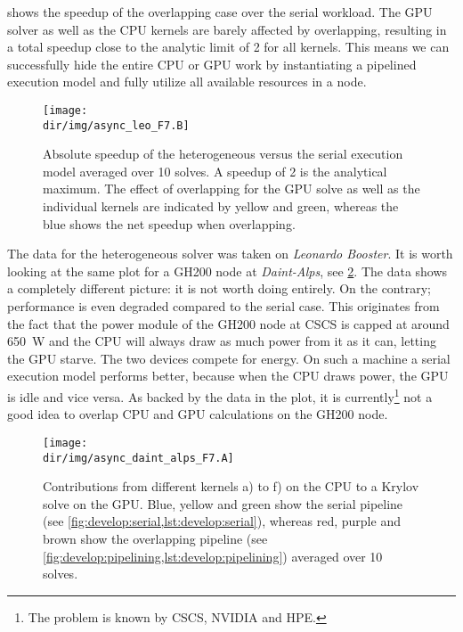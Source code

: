  shows the speedup of the overlapping case over the serial workload.
The GPU solver as well as the CPU kernels are barely affected by overlapping, resulting in a total speedup close to the analytic limit of \num{2} for all kernels.
This means we can successfully hide the entire CPU or GPU work by instantiating a pipelined execution model and fully utilize all available resources in a node.
\begin{figure}
\centering
\texttt{[image: \\dir/img/async\_leo\_F7.B]}
\caption{
Absolute speedup of the heterogeneous versus the serial execution model averaged over \num{10} solves.
A speedup of \num{2} is the analytical maximum.
The effect of overlapping for the GPU solve as well as the individual kernels are indicated by yellow and green, whereas the blue shows the net speedup when overlapping.
}
\label{fig:async:F7:leo:speedup}
\end{figure}

The data for the heterogeneous solver was taken on \emph{Leonardo Booster}.
It is worth looking at the same plot for a GH200 node at \emph{Daint-Alps}, see \cref{fig:async:F7:daint:bar}.
The data shows a completely different picture: it is not worth doing entirely.
On the contrary; performance is even degraded compared to the serial case.
This originates from the fact that the power module of the GH200 node at CSCS is capped at around \SI{650}{\watt} and the CPU will always draw as much power from it as it can, letting the GPU starve.
The two devices compete for energy.
On such a machine a serial execution model performs better, because when the CPU draws power, the GPU is idle and vice versa.
As backed by the data in the plot, it is currently\footnote{The problem is known by CSCS, NVIDIA and HPE.} not a good idea to overlap CPU and GPU calculations on the GH200 node.
\begin{figure}
    \centering
    \texttt{[image: \\dir/img/async\_daint\_alps\_F7.A]}
    \caption{Contributions from different kernels a) to f) on the CPU to a Krylov solve on the GPU. Blue, yellow and green show the serial pipeline (see \cref{fig:develop:serial,lst:develop:serial}), whereas red, purple and brown show the overlapping pipeline (see \cref{fig:develop:pipelining,lst:develop:pipelining}) averaged over \num{10} solves. }
    \label{fig:async:F7:daint:bar}
\end{figure}

